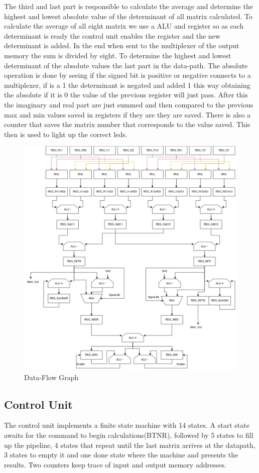 \documentclass[12pt]{article}
\begin{document}
The third and last part is responsible to calculate the average and determine the highest and lowest absolute value of the determinant of all matrix calculated. To calculate the average of all eight matrix we use a ALU and register so as each determinant is ready the control unit enables the register and the new determinant is added. In the end when sent to the multiplexer of the output memory the sum is divided by eight. To determine the highest and lowest determinant of the absolute values the last part in the data-path. The absolute operation is done by seeing if the signed bit is positive or negative connects to a multiplexer, if is a 1 the determinant is negated and added 1 this way obtaining the absolute if it is 0 the value of the previous register will just pass. After this the imaginary and real part are just summed and then compared to the previous max and min values saved in registers if they are they are saved. There is also a counter that saves the matrix number that corresponds to the value saved. This then is used to light up the correct leds. 
\begin{figure}[H]
	\centering
	\includegraphics[width=0.75\linewidth]{images/DataPath.png}
	\caption{Data-Flow Graph}
	\label{fig:datapath}
\end{figure}


\subsection{Control Unit}
The control unit implements a finite state machine with 14 states. A start state awaits for the command to begin calculations(BTNR), followed by 5 states to fill up the pipeline, 4 states that repeat until the last matrix arrives at the datapath, 3 states to empty it and one done state where the machine and presents the results.
Two counters keep trace of input and output memory addresses.
\end{document}
